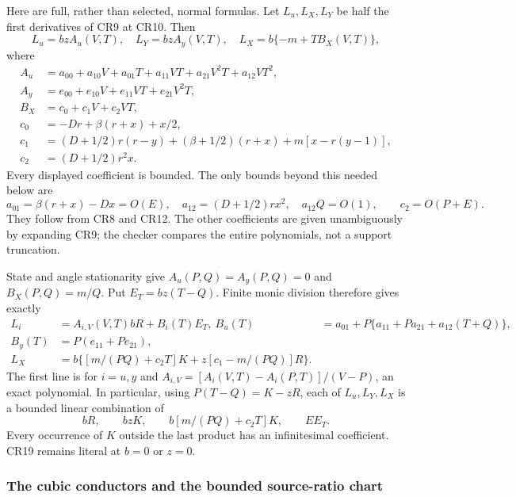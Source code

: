 Here are full, rather than selected, normal formulas. Let $L_u,L_X,L_Y$
be half the first derivatives of CR9 at CR10. Then
\[
 L_u=bz A_u(V,T),\quad L_Y=bz A_y(V,T),\quad
 L_X=b\{-m+TB_X(V,T)\},
 \tag{CR16}
\]
where
\[
\begin{aligned}
 A_u&=a_{00}+a_{10}V+a_{01}T+a_{11}VT+a_{21}V^2T+a_{12}VT^2,\\
 A_y&=e_{00}+e_{10}V+e_{11}VT+e_{21}V^2T,\\
 B_X&=c_0+c_1V+c_2VT,\\
 c_0&=-Dr+\beta(r+x)+x/2,\\
 c_1&=(D+1/2)r(r-y)+(\beta+1/2)(r+x)
                        +m[x-r(y-1)],\\
 c_2&=(D+1/2)r^2x.
\end{aligned}\tag{CR17}
\]
Every displayed coefficient is bounded. The only bounds beyond this
needed below are
\[
 a_{01}=\beta(r+x)-Dx=O(E),\quad
 a_{12}=(D+1/2)rx^2,\quad a_{12}Q=O(1),
 \qquad c_2=O(P+E).
 \tag{CR18}
\]
They follow from CR8 and CR12. The other coefficients are given
unambiguously by expanding CR9; the checker compares the entire
polynomials, not a support truncation.

State and angle stationarity give
$A_u(P,Q)=A_y(P,Q)=0$ and $B_X(P,Q)=m/Q$.
Put $E_T=bz(T-Q)$. Finite monic division therefore gives exactly
\[
\begin{aligned}
 L_i&=A_{i,V}(V,T)bR+B_i(T)E_T,\
 B_u(T)&=a_{01}+P\{a_{11}+Pa_{21}+a_{12}(T+Q)\},\\
 B_y(T)&=P(e_{11}+Pe_{21}),\\
 L_X&=b\{[m/(PQ)+c_2T]K+z[c_1-m/(PQ)]R\}.
\end{aligned}\tag{CR19}
\]
The first line is for $i=u,y$ and
$A_{i,V}=[A_i(V,T)-A_i(P,T)]/(V-P)$, an exact polynomial.
In particular, using $P(T-Q)=K-zR$, each of $L_u,L_Y,L_X$
is a bounded linear combination of
\[
 bR,\qquad bzK,\qquad b[m/(PQ)+c_2T]K,
 \qquad E E_T.
 \tag{CR20}
\]
Every occurrence of $K$ outside the last product has an
infinitesimal coefficient. CR19 remains literal at $b=0$ or $z=0$.

\subsubsection*{The cubic conductors and the bounded source-ratio chart}

